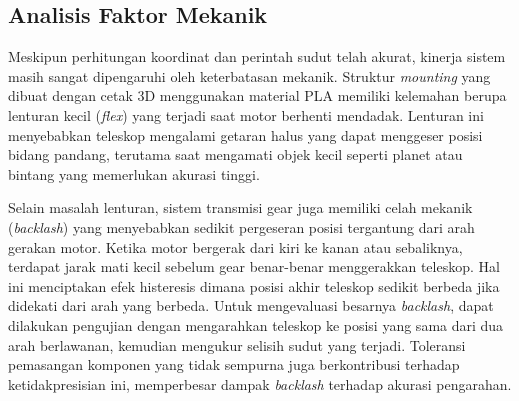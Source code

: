 \subsection{Analisis Faktor Mekanik} \label{IV.AnalisisMekanik}
Meskipun perhitungan koordinat dan perintah sudut telah akurat, kinerja sistem masih sangat dipengaruhi oleh keterbatasan mekanik. Struktur \textit{mounting} yang dibuat dengan cetak 3D menggunakan material PLA memiliki kelemahan berupa lenturan kecil (\textit{flex}) yang terjadi saat motor berhenti mendadak. Lenturan ini menyebabkan teleskop mengalami getaran halus yang dapat menggeser posisi bidang pandang, terutama saat mengamati objek kecil seperti planet atau bintang yang memerlukan akurasi tinggi. \par
Selain masalah lenturan, sistem transmisi gear juga memiliki celah mekanik (\textit{backlash}) yang menyebabkan sedikit pergeseran posisi tergantung dari arah gerakan motor. Ketika motor bergerak dari kiri ke kanan atau sebaliknya, terdapat jarak mati kecil sebelum gear benar-benar menggerakkan teleskop. Hal ini menciptakan efek histeresis dimana posisi akhir teleskop sedikit berbeda jika didekati dari arah yang berbeda. Untuk mengevaluasi besarnya \textit{backlash}, dapat dilakukan pengujian dengan mengarahkan teleskop ke posisi yang sama dari dua arah berlawanan, kemudian mengukur selisih sudut yang terjadi. Toleransi pemasangan komponen yang tidak sempurna juga berkontribusi terhadap ketidakpresisian ini, memperbesar dampak \textit{backlash} terhadap akurasi pengarahan. \par


